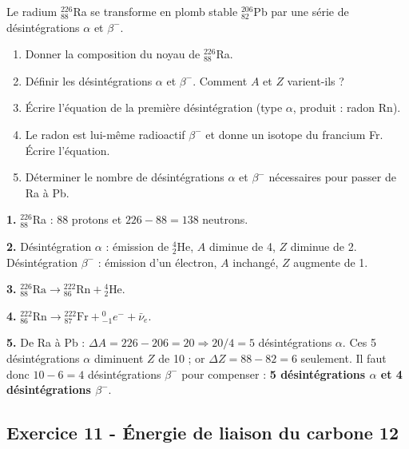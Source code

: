 \documentclass[12pt,a4paper]{article}
\begin{document}
\begin{boiteexercice}
Le radium ${}_{88}^{226}$Ra se transforme en plomb stable ${}_{82}^{206}$Pb par une série de désintégrations $\alpha$ et $\beta^-$.
\begin{enumerate}
  \item Donner la composition du noyau de ${}_{88}^{226}$Ra.
  \item Définir les désintégrations $\alpha$ et $\beta^-$. Comment $A$ et $Z$ varient-ils ?
  \item Écrire l'équation de la première désintégration (type $\alpha$, produit : radon Rn).
  \item Le radon est lui-même radioactif $\beta^-$ et donne un isotope du francium Fr. Écrire l'équation.
  \item Déterminer le nombre de désintégrations $\alpha$ et $\beta^-$ nécessaires pour passer de Ra à Pb.
\end{enumerate}
\end{boiteexercice}

\begin{boitecorrige}
\textbf{1.} ${}_{88}^{226}$Ra : 88 protons et $226-88 = 138$ neutrons.

\textbf{2.} Désintégration $\alpha$ : émission de ${}_{2}^{4}$He, $A$ diminue de 4, $Z$ diminue de 2. Désintégration $\beta^-$ : émission d'un électron, $A$ inchangé, $Z$ augmente de 1.

\textbf{3.} ${}_{88}^{226}\text{Ra} \rightarrow {}_{86}^{222}\text{Rn} + {}_{2}^{4}\text{He}$.

\textbf{4.} ${}_{86}^{222}\text{Rn} \rightarrow {}_{87}^{222}\text{Fr} + {}_{-1}^{0}e^- + \bar{\nu}_e$.

\textbf{5.} De Ra à Pb : $\Delta A = 226-206 = 20 \Rightarrow 20/4 = 5$ désintégrations $\alpha$. Ces 5 désintégrations $\alpha$ diminuent $Z$ de 10 ; or $\Delta Z = 88-82 = 6$ seulement. Il faut donc $10 - 6 = 4$ désintégrations $\beta^-$ pour compenser : \textbf{5 désintégrations $\alpha$ et 4 désintégrations $\beta^-$}.
\end{boitecorrige}

\subsection*{Exercice 11 - Énergie de liaison du carbone 12 \niveau{\moyen}}
\end{document}
